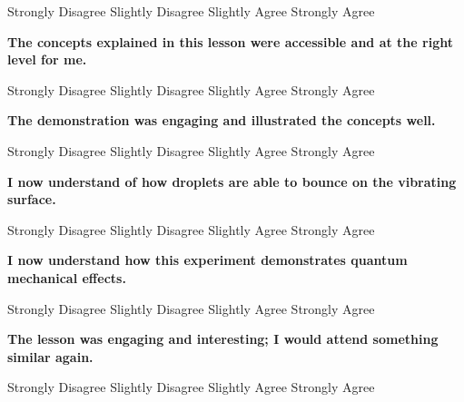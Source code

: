 \vspace{3mm}
Strongly Disagree\hspace{1.5cm}	Slightly Disagree\hspace{1.5cm}	Slightly Agree\hspace{1.5cm}		Strongly Agree
\vspace{3mm}

\noindent \textbf{The concepts explained in this lesson were accessible and at the right level for me.}

\vspace{3mm}
Strongly Disagree\hspace{1.5cm}	Slightly Disagree\hspace{1.5cm}	Slightly Agree\hspace{1.5cm}		Strongly Agree
\vspace{3mm}

\noindent \textbf{The demonstration was engaging and illustrated the concepts well.}

\vspace{3mm}
Strongly Disagree\hspace{1.5cm}	Slightly Disagree\hspace{1.5cm}	Slightly Agree\hspace{1.5cm}		Strongly Agree
\vspace{3mm}

\noindent \textbf{I now understand of how droplets are able to bounce on the vibrating surface.}

\vspace{3mm}
Strongly Disagree\hspace{1.5cm}	Slightly Disagree\hspace{1.5cm}	Slightly Agree\hspace{1.5cm}		Strongly Agree
\vspace{3mm}

\noindent \textbf{I now understand how this experiment demonstrates quantum mechanical effects.}

\vspace{3mm}
Strongly Disagree\hspace{1.5cm}	Slightly Disagree\hspace{1.5cm}	Slightly Agree\hspace{1.5cm}		Strongly Agree
\vspace{3mm}

\noindent \textbf{The lesson was engaging and interesting; I would attend something similar again.}

\vspace{3mm}
Strongly Disagree\hspace{1.5cm}	Slightly Disagree\hspace{1.5cm}	Slightly Agree\hspace{1.5cm}		Strongly Agree
\vspace{3mm}

